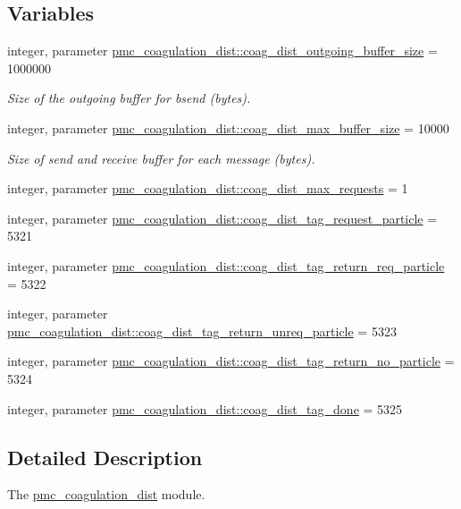 \subsection*{Variables}
\begin{DoxyCompactItemize}
\item 
integer, parameter \mbox{\hyperlink{namespacepmc__coagulation__dist_abb819d699f6444884920ff2d74ec6029}{pmc\+\_\+coagulation\+\_\+dist\+::coag\+\_\+dist\+\_\+outgoing\+\_\+buffer\+\_\+size}} = 1000000
\begin{DoxyCompactList}\small\item\em Size of the outgoing buffer for {\ttfamily bsend} (bytes). \end{DoxyCompactList}\item 
integer, parameter \mbox{\hyperlink{namespacepmc__coagulation__dist_ab3e4473a732c373efcf8ab530122cae8}{pmc\+\_\+coagulation\+\_\+dist\+::coag\+\_\+dist\+\_\+max\+\_\+buffer\+\_\+size}} = 10000
\begin{DoxyCompactList}\small\item\em Size of send and receive buffer for each message (bytes). \end{DoxyCompactList}\item 
integer, parameter \mbox{\hyperlink{namespacepmc__coagulation__dist_ad7130affac816ec06993cec78d709373}{pmc\+\_\+coagulation\+\_\+dist\+::coag\+\_\+dist\+\_\+max\+\_\+requests}} = 1
\item 
integer, parameter \mbox{\hyperlink{namespacepmc__coagulation__dist_ab6b1e6f6a55e57f278333e999c39e410}{pmc\+\_\+coagulation\+\_\+dist\+::coag\+\_\+dist\+\_\+tag\+\_\+request\+\_\+particle}} = 5321
\item 
integer, parameter \mbox{\hyperlink{namespacepmc__coagulation__dist_abbe8d538b4d2ecf332192cee8127f15d}{pmc\+\_\+coagulation\+\_\+dist\+::coag\+\_\+dist\+\_\+tag\+\_\+return\+\_\+req\+\_\+particle}} = 5322
\item 
integer, parameter \mbox{\hyperlink{namespacepmc__coagulation__dist_aae979dd8e66e985362f2063f669f36dc}{pmc\+\_\+coagulation\+\_\+dist\+::coag\+\_\+dist\+\_\+tag\+\_\+return\+\_\+unreq\+\_\+particle}} = 5323
\item 
integer, parameter \mbox{\hyperlink{namespacepmc__coagulation__dist_a2d3fbb1c25d95ef5333fa20db3f5eaf0}{pmc\+\_\+coagulation\+\_\+dist\+::coag\+\_\+dist\+\_\+tag\+\_\+return\+\_\+no\+\_\+particle}} = 5324
\item 
integer, parameter \mbox{\hyperlink{namespacepmc__coagulation__dist_ae077b985386ed347d8b4f7791a9cbfcf}{pmc\+\_\+coagulation\+\_\+dist\+::coag\+\_\+dist\+\_\+tag\+\_\+done}} = 5325
\end{DoxyCompactItemize}


\subsection{Detailed Description}
The \mbox{\hyperlink{namespacepmc__coagulation__dist}{pmc\+\_\+coagulation\+\_\+dist}} module. 

